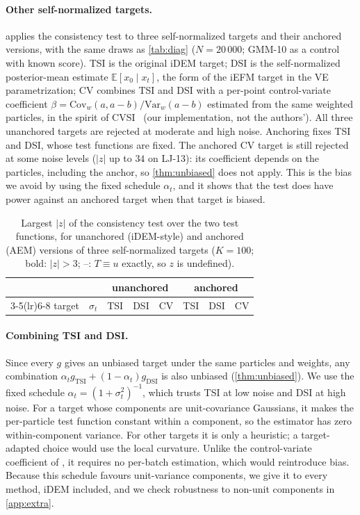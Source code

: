 \paragraph{Other self-normalized targets.}
 applies the consistency test to three self-normalized targets and their anchored versions, with the same draws as \cref{tab:diag} ($N=20\,000$; GMM-10 as a control with known score). TSI is the original iDEM target; DSI is the self-normalized posterior-mean estimate $\mathbb{E}[x_0\mid x_t]$, the form of the iEFM target in the VE parametrization; CV combines TSI and DSI with a per-point control-variate coefficient $\beta=\mathrm{Cov}_w(a,a-b)/\mathrm{Var}_w(a-b)$ estimated from the same weighted particles, in the spirit of CVSI~\citep{cvsi2025} (our implementation, not the authors'). All three unanchored targets are rejected at moderate and high noise. Anchoring fixes TSI and DSI, whose test functions are fixed. The anchored CV target is still rejected at some noise levels ($|z|$ up to $34$ on LJ-13): its coefficient depends on the particles, including the anchor, so \cref{thm:unbiased} does not apply. This is the bias we avoid by using the fixed schedule $\alpha_t$, and it shows that the test does have power against an anchored target when that target is biased.

\begin{table}[h]
\centering
\caption{Largest $|z|$ of the consistency test over the two test functions, for unanchored (iDEM-style) and anchored (AEM) versions of three self-normalized targets ($K=100$; bold: $|z|>3$; --: $T\equiv u$ exactly, so $z$ is undefined).}
\label{tab:kinds}
\small
\setlength{\tabcolsep}{3.5pt}
\begin{tabular}{lrcccccc}
\toprule
& & \multicolumn{3}{c}{unanchored} & \multicolumn{3}{c}{anchored}\\
\cmidrule(lr){3-5}\cmidrule(lr){6-8}
target & $\sigma_t$ & TSI & DSI & CV & TSI & DSI & CV\\
\midrule

\bottomrule
\end{tabular}
\end{table}

\paragraph{Combining TSI and DSI.}
Since every $g$ gives an unbiased target under the same particles and weights, any combination $\alpha_t g_{\mathrm{TSI}}+(1-\alpha_t)g_{\mathrm{DSI}}$ is also unbiased (\cref{thm:unbiased}).
We use the fixed schedule $\alpha_t=(1+\sigma_t^2)^{-1}$, which trusts TSI at low noise and DSI at high noise. For a target whose components are unit-covariance Gaussians, it makes the per-particle test function constant within a component, so the estimator has zero within-component variance. For other targets it is only a heuristic; a target-adapted choice would use the local curvature. Unlike the control-variate coefficient of \citet{cvsi2025}, it requires no per-batch estimation, which would reintroduce bias. Because this schedule favours unit-variance components, we give it to every method, iDEM included, and we check robustness to non-unit components in \cref{app:extra}.

